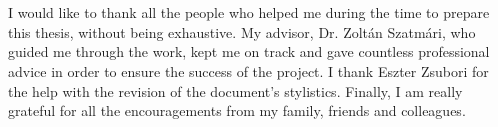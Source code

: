 \chapter*{\koszonetnyilvanitas}

I would like to thank all the people who helped me during the time to prepare this thesis, without being exhaustive. My advisor, Dr. Zoltán Szatmári, who guided me through the work, kept me on track and gave countless professional advice in order to ensure the success of the project. I thank Eszter Zsubori for the help with the revision of the document's stylistics. Finally, I am really grateful for all the encouragements from my family, friends and colleagues.